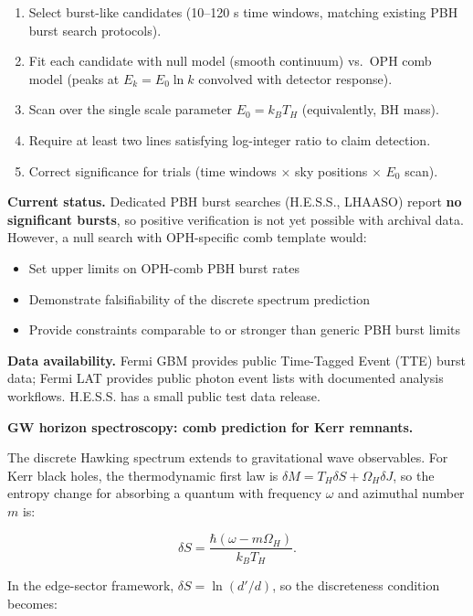 \documentclass[11pt,a4paper]{article}
\theoremstyle{remark}
\providecommand{\tightlist}{%
  \setlength{\itemsep}{0pt}\setlength{\parskip}{0pt}}
\begin{document}
\begin{enumerate}
\def\labelenumi{\arabic{enumi}.}
\tightlist
\item
  Select burst-like candidates (10--120 s time windows, matching existing
  PBH burst search protocols).
\item
  Fit each candidate with null model (smooth continuum) vs.~OPH comb model
  (peaks at \(E_k = E_0 \ln k\) convolved with detector response).
\item
  Scan over the single scale parameter \(E_0 = k_B T_H\) (equivalently, BH mass).
\item
  Require at least two lines satisfying log-integer ratio to claim detection.
\item
  Correct significance for trials (time windows \(\times\) sky positions \(\times\)
  \(E_0\) scan).
\end{enumerate}

\textbf{Current status.} Dedicated PBH burst searches (H.E.S.S., LHAASO) report
\textbf{no significant bursts}, so positive verification is not yet possible with
archival data. However, a null search with OPH-specific comb template would:

\begin{itemize}
\tightlist
\item
  Set upper limits on OPH-comb PBH burst rates
\item
  Demonstrate falsifiability of the discrete spectrum prediction
\item
  Provide constraints comparable to or stronger than generic PBH burst limits
\end{itemize}

\textbf{Data availability.} Fermi GBM provides public Time-Tagged Event (TTE)
burst data; Fermi LAT provides public photon event lists with documented
analysis workflows. H.E.S.S. has a small public test data release.

\textbf{GW horizon spectroscopy: comb prediction for Kerr remnants.}

The discrete Hawking spectrum extends to gravitational wave observables. For
Kerr black holes, the thermodynamic first law is \(\delta M = T_H \delta S +
\Omega_H \delta J\), so the entropy change for absorbing a quantum with
frequency \(\omega\) and azimuthal number \(m\) is:

\[
\delta S = \frac{\hbar(\omega - m\Omega_H)}{k_B T_H}.
\]

In the edge-sector framework, \(\delta S = \ln(d'/d)\), so the discreteness
condition becomes:
\end{document}
